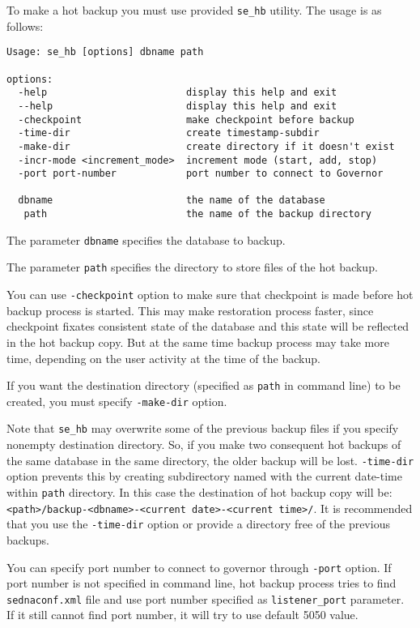 \documentclass[a4paper,12pt]{article}
\begin{document}
To make a hot backup you must use provided \verb!se_hb! utility. The usage is as
follows:

\small{
\begin{verbatim}
Usage: se_hb [options] dbname path

options:
  -help                        display this help and exit
  --help                       display this help and exit
  -checkpoint                  make checkpoint before backup
  -time-dir                    create timestamp-subdir
  -make-dir                    create directory if it doesn't exist
  -incr-mode <increment_mode>  increment mode (start, add, stop)
  -port port-number            port number to connect to Governor

  dbname                       the name of the database
   path                        the name of the backup directory
\end{verbatim}}

The parameter \verb!dbname! specifies the database to backup.

The parameter \verb!path! specifies the directory to store files of the hot
backup.

You can use \verb!-checkpoint! option to make sure that checkpoint is made
before hot backup process is started. This may make restoration process faster,
since checkpoint fixates consistent state of the database and this state will be
reflected in the hot backup copy. But at the same time backup process may take
more time, depending on the user activity at the time of the backup.

If you want the destination directory (specified as \verb!path! in command line)
to be created, you must specify \verb!-make-dir! option.

Note that \verb!se_hb! may overwrite some of the previous backup files if you
specify nonempty destination directory. So, if you make two consequent hot
backups of the same database in the same directory, the older backup will be
lost. \verb!-time-dir! option prevents this by creating subdirectory named with
the current date-time within \verb!path! directory. In this case the destination
of hot backup copy will be:
\verb!<path>/backup-<dbname>-<current date>-<current time>/!.
It is recommended that you use the \verb!-time-dir! option or provide a
directory free of the previous backups.

You can specify port number to connect to governor through \verb!-port! option.
If port number is not specified in command line, hot backup process tries to
find \verb!sednaconf.xml! file and use port number specified as
\verb!listener_port! parameter. If it still cannot find port number, it will try
to use default 5050 value.
\end{document}
